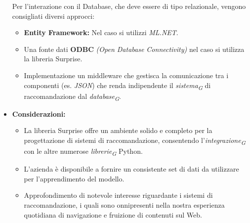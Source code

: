 \documentclass{article}
\begin{document}
\begin{itemize}
    Per l'interazione con il Database, che deve essere di tipo relazionale, vengono consigliati diversi approcci: 
        
    \begin{itemize}
    \item \textbf{Entity Framework:} Nel caso si utilizzi \textit{ML.NET}.
    \item Una fonte dati \textbf{ODBC} \textit{(Open Database Connectivity)} nel caso si utilizza la libreria Surprise.
    \item Implementazione un middleware che gestisca la comunicazione tra i componenti (es. \textit{JSON}) che renda indipendente il \textit{sistema}\textsubscript{\textit{G}} di raccomandazione dal \textit{database}\textsubscript{\textit{G}}.

    \end{itemize}
    
    \item[] \textbf{Considerazioni:}
    \begin{itemize}
        \item La libreria Surprise offre un ambiente solido e completo per la progettazione di sistemi di raccomandazione, consentendo l’\textit{integrazione}\textsubscript{\textit{G}} con le altre numerose \textit{librerie}\textsubscript{\textit{G}} Python.
        \item L’azienda è disponibile a fornire un consistente set di dati da utilizzare per l’apprendimento del modello.
        \item Approfondimento di notevole interesse riguardante i sistemi di raccomandazione, i quali sono onnipresenti nella nostra esperienza quotidiana di navigazione e fruizione di contenuti sul Web.
    \end{itemize} 

\end{itemize}
\pagebreak

\end{document}
